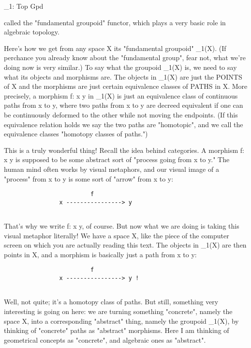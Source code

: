                       \Pi _{1}: Top \to  Gpd

called the "fundamental groupoid" functor, which plays a very basic role
in algebraic topology.  

Here's how we get from any space X its "fundamental groupoid"
\Pi _{1}(X).  (If perchance you already know about the
"fundamental group", fear not, what we're doing now is very
similar.)  To say what the groupoid \Pi _{1}(X) is, we need to say
what its objects and morphisms are.  The objects in \Pi _{1}(X)
are just the POINTS of X and the morphisms are just certain equivalence
classes of PATHS in X.  More precisely, a morphism f: x \to  y in
\Pi _{1}(X) is just an equivalence class of continuous paths from
x to y, where two paths from x to y are decreed equivalent if one can be
continuously deformed to the other while not moving the endpoints.  (If
this equivalence relation holds we say the two paths are
"homotopic", and we call the equivalence classes
"homotopy classes of paths.")

This is a truly wonderful thing!  Recall the idea behind categories.
A morphism f: x \to  y is supposed to be some abstract sort of "process
going from x to y."  The human mind often works by visual metaphors, and
our visual image of a "process" from x to y is some sort of "arrow" from
x to y:

\begin{verbatim}
                         f
                x ----------------> y


\end{verbatim}
    
That's why we write f: x \to  y, of course.  But now what we are doing is
taking this visual metaphor literally!  We have a space X, like the
piece of the computer screen on which you are actually reading this
text.  The objects in \Pi _{1}(X) are then points in X, and a morphism is
basically just a path from x to y:

\begin{verbatim}
                         f
                x ----------------> y !


\end{verbatim}
    
Well, not quite; it's a homotopy class of paths.  But still, something
very interesting is going on here: we are turning something
"concrete", namely the space X, into a corresponding
"abstract" thing, namely the groupoid \Pi _{1}(X), by
thinking of "concrete" paths as "abstract"
morphisms.  Here I am thinking of geometrical concepts as
"concrete", and algebraic ones as "abstract".

